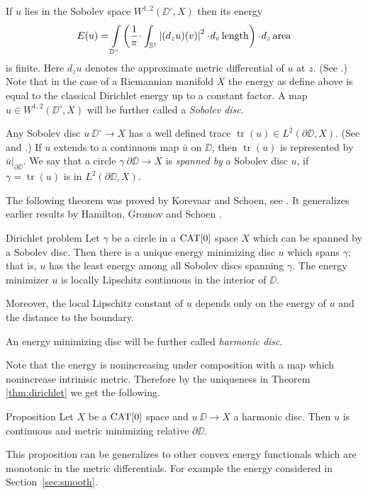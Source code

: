 \documentclass{article}
\begin{document}
If $u$ lies in the Sobolev space $W^{1,2}(\DD^\circ,X)$ then its energy 
\[E(u)=
\int\limits_{\DD^\circ}\left(\frac{1}{\pi}\cdot\int_{\mathbb{S}^1}\left|(d_zu)(v)\right|^2\cdot d_v\length\right)\cdot d_z\area\]
is finite. 
Here $d_zu$ denotes the approximate metric differential of $u$ at $z$.
(See \cite{LW}.)
Note that in the case of a Riemannian manifold $X$ the energy as define above is equal to
the classical Dirichlet energy up to a constant factor.
A map $u\in W^{1,2}(\DD^\circ,X)$ will be further called a \emph{Sobolev disc}.

Any Sobolev disc $u\:\DD^\circ\to X$ has a well defined trace $\operatorname{tr}(u)\in L^2(\partial\DD,X)$. 
(See \cite{KS} and \cite{LW}.)
If $u$ extends to a continuous map $\bar u$ on $\DD$, then $\operatorname{tr}(u)$ is represented by $\bar u|_{\partial\DD}$. 
We say that a circle $\gamma\:\partial\DD\to X$ is {\em spanned by} a Sobolev disc $u$, if $\gamma=\operatorname{tr}(u)$ is in 
$L^2(\partial\DD,X)$.

The following theorem was proved by Korevaar and Schoen,
see \cite[theorems 2.2 and 2.4.6]{KS}. 
It generalizes earlier results by Hamilton, Gromov and Schoen  \cite{H,GS}.

\begin{thm}{Dirichlet problem}\label{thm:dirichlet}
Let $\gamma$ be a circle in a $\mathop{\rm CAT}\nolimits[0]$ space $X$ which can be spanned by a Sobolev disc. 
Then there is a unique energy minimizing disc $u$ which spans $\gamma$; 
that is, $u$
has the least energy among all Sobolev discs spanning $\gamma$. 
The energy minimizer $u$ is locally Lipschitz continuous in the interior of $\DD$.

Moreover, the local Lipschitz constant of $u$ depends only on the energy of $u$ and the distance to the boundary.
\end{thm}

An energy minimizing disc will be further called \emph{harmonic disc}.

Note that the energy is nonincreasing under composition with a map which nonincrease intrinisic metric.
Therefore by the uniqueness in Theorem \ref{thm:dirichlet} we get the following.

\begin{thm}{Proposition}\label{prop:harmonic}
Let $X$ be a $\mathop{\rm CAT}\nolimits[0]$ space 
and $u\:\DD\to X$ a harmonic disc.
Then $u$ is continuous and metric minimizing relative $\partial\DD$.
\end{thm}

This proposition can be generalizes to other convex energy functionals which are monotonic in the metric differentials.
For example the energy considered in Section~\ref{sec:smooth}.
\end{document}
